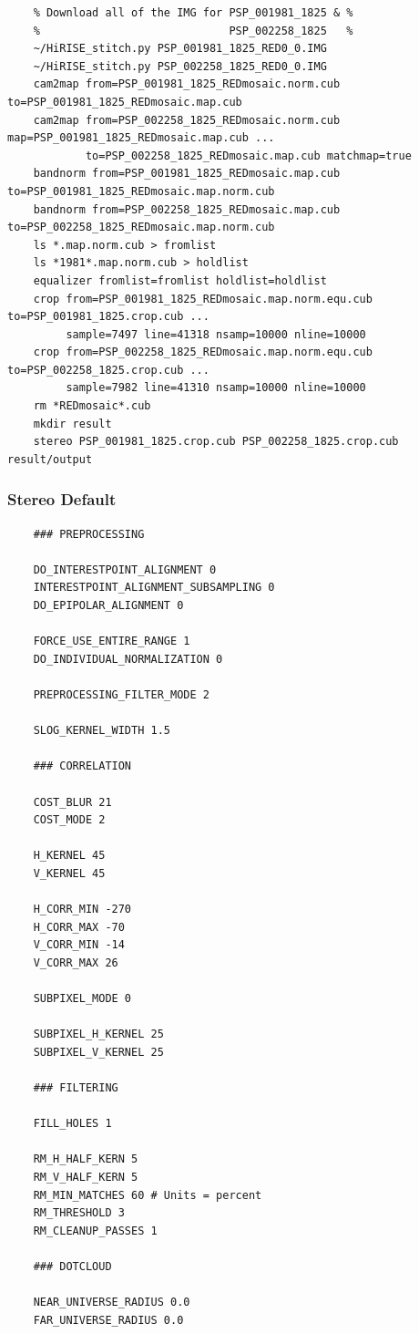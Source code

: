 \begin{verbatim}
    % Download all of the IMG for PSP_001981_1825 & %
    %                             PSP_002258_1825   %
    ~/HiRISE_stitch.py PSP_001981_1825_RED0_0.IMG
    ~/HiRISE_stitch.py PSP_002258_1825_RED0_0.IMG
    cam2map from=PSP_001981_1825_REDmosaic.norm.cub to=PSP_001981_1825_REDmosaic.map.cub
    cam2map from=PSP_002258_1825_REDmosaic.norm.cub map=PSP_001981_1825_REDmosaic.map.cub ...
            to=PSP_002258_1825_REDmosaic.map.cub matchmap=true
    bandnorm from=PSP_001981_1825_REDmosaic.map.cub to=PSP_001981_1825_REDmosaic.map.norm.cub
    bandnorm from=PSP_002258_1825_REDmosaic.map.cub to=PSP_002258_1825_REDmosaic.map.norm.cub
    ls *.map.norm.cub > fromlist
    ls *1981*.map.norm.cub > holdlist
    equalizer fromlist=fromlist holdlist=holdlist
    crop from=PSP_001981_1825_REDmosaic.map.norm.equ.cub to=PSP_001981_1825.crop.cub ...
         sample=7497 line=41318 nsamp=10000 nline=10000
    crop from=PSP_002258_1825_REDmosaic.map.norm.equ.cub to=PSP_002258_1825.crop.cub ...
         sample=7982 line=41310 nsamp=10000 nline=10000
    rm *REDmosaic*.cub
    mkdir result
    stereo PSP_001981_1825.crop.cub PSP_002258_1825.crop.cub result/output
\end{verbatim}

\subsubsection*{Stereo Default}

\begin{verbatim}
    ### PREPROCESSING

    DO_INTERESTPOINT_ALIGNMENT 0
    INTERESTPOINT_ALIGNMENT_SUBSAMPLING 0
    DO_EPIPOLAR_ALIGNMENT 0

    FORCE_USE_ENTIRE_RANGE 1
    DO_INDIVIDUAL_NORMALIZATION 0

    PREPROCESSING_FILTER_MODE 2

    SLOG_KERNEL_WIDTH 1.5

    ### CORRELATION

    COST_BLUR 21
    COST_MODE 2

    H_KERNEL 45
    V_KERNEL 45

    H_CORR_MIN -270
    H_CORR_MAX -70
    V_CORR_MIN -14
    V_CORR_MAX 26

    SUBPIXEL_MODE 0

    SUBPIXEL_H_KERNEL 25
    SUBPIXEL_V_KERNEL 25

    ### FILTERING

    FILL_HOLES 1

    RM_H_HALF_KERN 5
    RM_V_HALF_KERN 5
    RM_MIN_MATCHES 60 # Units = percent
    RM_THRESHOLD 3
    RM_CLEANUP_PASSES 1

    ### DOTCLOUD

    NEAR_UNIVERSE_RADIUS 0.0
    FAR_UNIVERSE_RADIUS 0.0
\end{verbatim}

